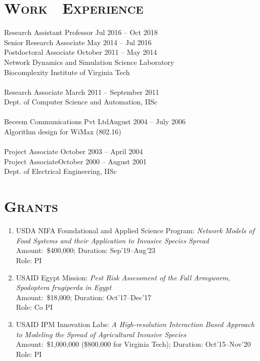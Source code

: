 \documentclass[10pt]{article} %
\begin{document}
\begin{resume}
\section{\textnormal{\textsc{Work\,\,\,\, Experience}}} 
{Research Assistant Professor} \hfill Jul 2016 -- Oct 2018\\
Senior Research Associate \hfill May 2014 -- Jul 2016\\
Postdoctoral Associate \hfill October 2011 -- May 2014\\
Network Dynamics and Simulation Science Laboratory\\
Biocomplexity Institute of Virginia Tech\\
~~~\\
Research Associate \hfill March 2011 -- September 2011\\
Dept. of Computer Science and Automation, IISc \\
~~~\\
{Beceem Communications Pvt Ltd}\hfill August 2004 -- July 2006\\
Algorithm design for WiMax (802.16) \\
~~~\\
Project Associate \hfill October 2003 -- April 2004\\ 
Project Associate\hfill October 2000 -- August 2001\\ 
Dept. of Electrical Engineering, IISc \\
\clearpage
\section{\textnormal{\textsc{Grants}}}
\begin{enumerate}[$\circ$]
\item USDA NIFA Foundational and Applied Science Program: \emph{Network
Models of Food Systems and their Application to Invasive Species Spread} \\
Amount:~\$400,000; Duration: Sep'19--Aug'23\\
Role: PI
\item USAID Egypt Mission: \emph{Pest Risk Assessment of the Fall Armyworm,
Spodoptera frugiperda in Egypt}\\ Amount:~\$18,000; Duration:
Oct'17--Dec'17\\ Role: Co PI
\item USAID IPM Innovation Labs: \emph{A High-resolution Interaction Based
Approach to Modeling the Spread of Agricultural Invasive Species}\\
Amount:~\$1,000,000 (\$800,000 for Virginia Tech); Duration: Oct'15--Nov'20\\
Role: PI
\end{enumerate}

\end{resume}
\end{document}
